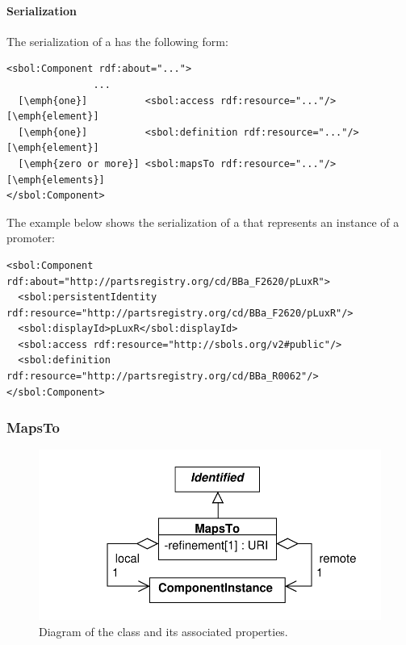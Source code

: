 
\paragraph{Serialization}

The serialization of a  has the following form:

\begin{lstlisting}
<sbol:Component rdf:about="...">
               ...
  [\emph{one}]          <sbol:access rdf:resource="..."/> [\emph{element}]
  [\emph{one}]          <sbol:definition rdf:resource="..."/> [\emph{element}]    
  [\emph{zero or more}] <sbol:mapsTo rdf:resource="..."/> [\emph{elements}]
</sbol:Component>
\end{lstlisting}

The example below shows the serialization of a 
that represents an instance of a promoter:

\begin{lstlisting}
<sbol:Component rdf:about="http://partsregistry.org/cd/BBa_F2620/pLuxR">
  <sbol:persistentIdentity rdf:resource="http://partsregistry.org/cd/BBa_F2620/pLuxR"/>
  <sbol:displayId>pLuxR</sbol:displayId>
  <sbol:access rdf:resource="http://sbols.org/v2#public"/>
  <sbol:definition rdf:resource="http://partsregistry.org/cd/BBa_R0062"/>
</sbol:Component>
\end{lstlisting}



\subsubsection{MapsTo}
\label{sec:MapsTo}

\begin{figure}[ht]
\begin{center}
\includegraphics[scale=0.6]{uml/maps_to}
\caption[]{Diagram of the  class and its associated properties.}
\label{uml:maps_to}
\end{center}
\end{figure}

